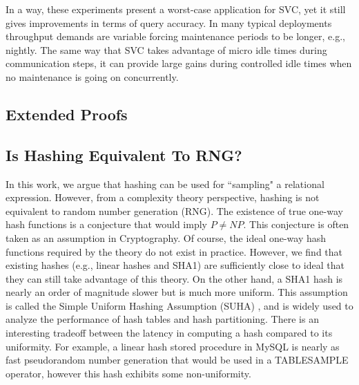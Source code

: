 In a way, these experiments present a worst-case application for SVC, yet it still gives improvements in terms of query accuracy.
In many typical deployments throughput demands are variable forcing maintenance periods to be longer, e.g., nightly.
The same way that SVC takes advantage of micro idle times during communication steps, it can provide large gains during controlled idle times when no maintenance is going on concurrently.

\subsection{Extended Proofs}

\subsection{Is Hashing Equivalent To RNG?}
In this work, we argue that hashing can be used for ``sampling" a relational expression.
However, from a complexity theory perspective, hashing is not equivalent to random number generation (RNG).
The existence of true one-way hash functions is a conjecture that would imply $P \ne NP$.
This conjecture is often taken as an assumption in Cryptography.
Of course, the ideal one-way hash functions required by the theory do not exist in practice. However, we find that existing hashes (e.g., linear hashes and SHA1) are sufficiently close to ideal that they can still take advantage of this theory. 
On the other hand, a SHA1 hash is nearly an order of magnitude slower but is much more uniform.
This assumption is called the Simple Uniform Hashing Assumption (SUHA) \cite{cormenintroduction}, and is widely used to analyze the performance of hash tables and hash partitioning.
There is an interesting tradeoff between the latency in computing a hash compared to its uniformity. For example, a linear hash stored procedure in MySQL is nearly as fast pseudorandom number generation that would be used in a TABLESAMPLE operator, however this hash exhibits some non-uniformity. 

